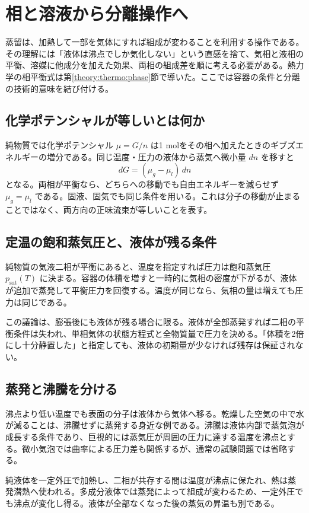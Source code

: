 \section{相と溶液から分離操作へ}
蒸留は、加熱して一部を気体にすれば組成が変わることを利用する操作である。その理解には「液体は沸点でしか気化しない」という直感を捨て、気相と液相の平衡、溶媒に他成分を加えた効果、両相の組成差を順に考える必要がある。熱力学の相平衡式は第\ref{theory:thermo:phase}節で導いた。ここでは容器の条件と分離の技術的意味を結び付ける。

\subsection{化学ポテンシャルが等しいとは何か}
\label{theory:phase_sep:chemical_potential}
純物質では化学ポテンシャル \(\mu=G/n\) は1 molをその相へ加えたときのギブズエネルギーの増分である。同じ温度・圧力の液体から蒸気へ微小量 \(dn\) を移すと
\[
 dG=(\mu_g-\mu_l)\,dn
\]
となる。両相が平衡なら、どちらへの移動でも自由エネルギーを減らせず \(\mu_g=\mu_l\) である。固液、固気でも同じ条件を用いる。これは分子の移動が止まることではなく、両方向の正味流束が等しいことを表す。

\subsection{定温の飽和蒸気圧と、液体が残る条件}
\label{theory:phase_sep:vapor}
純物質の気液二相が平衡にあると、温度を指定すれば圧力は飽和蒸気圧 \(p_{\mathrm{sat}}(T)\) に決まる。容器の体積を増すと一時的に気相の密度が下がるが、液体が追加で蒸発して平衡圧力を回復する。温度が同じなら、気相の量は増えても圧力は同じである。

この議論は、膨張後にも液体が残る場合に限る。液体が全部蒸発すれば二相の平衡条件は失われ、単相気体の状態方程式と全物質量で圧力を決める。「体積を2倍にし十分静置した」と指定しても、液体の初期量が少なければ残存は保証されない。

\subsection{蒸発と沸騰を分ける}
\label{theory:phase_sep:boiling}
沸点より低い温度でも表面の分子は液体から気体へ移る。乾燥した空気の中で水が減ることは、沸騰せずに蒸発する身近な例である。沸騰は液体内部で蒸気泡が成長する条件であり、巨視的には蒸気圧が周囲の圧力に達する温度を沸点とする。微小気泡では曲率による圧力差も関係するが、通常の試験問題では省略する。

純液体を一定外圧で加熱し、二相が共存する間は温度が沸点に保たれ、熱は蒸発潜熱へ使われる。多成分液体では蒸発によって組成が変わるため、一定外圧でも沸点が変化し得る。液体が全部なくなった後の蒸気の昇温も別である。

